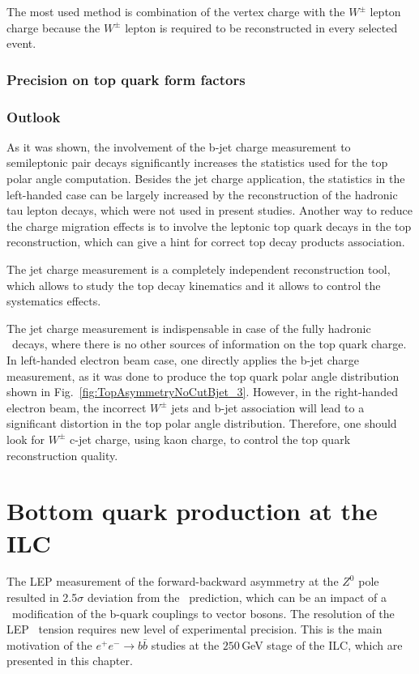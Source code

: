 The most used method is combination of the vertex charge with the $W^\pm$ lepton charge because the $W^\pm$ lepton is required to be reconstructed in every selected event. 
\subsubsection{Precision on top quark form factors }

\subsubsection{Outlook}
As it was shown, the involvement of the b-jet charge measurement to semileptonic \ttbar pair decays significantly increases the statistics used for the top polar angle computation.
Besides the jet charge application, the statistics in the left-handed case can be largely increased by the reconstruction of the hadronic tau lepton decays, which were not used in present studies. 
Another way to reduce the charge migration effects is to involve the leptonic top quark decays in the top reconstruction, which can give a hint for correct top decay products association.

The jet charge measurement is a completely independent reconstruction tool, which allows to study the top decay kinematics and it allows to control the systematics effects.

The jet charge measurement is indispensable in case of the fully hadronic \ttbar\ decays, where there is no other sources of information on the top quark charge. 
In left-handed electron beam case, one directly applies the b-jet charge measurement, as it was done to produce the top quark polar angle distribution shown in Fig.~\ref{fig:TopAsymmetryNoCutBjet_3}. 
However, in the right-handed electron beam, the incorrect $W^\pm$ jets and b-jet association will lead to a significant distortion in the top polar angle distribution. Therefore, one should look for $W^\pm$ c-jet charge, using kaon charge, to control the top quark reconstruction quality. 


\section{Bottom quark production at the ILC}
The LEP measurement of the forward-backward asymmetry at the $Z^0$ pole resulted in 2.5$\sigma$ deviation from the \sm\ prediction, which can be an impact of a \bsm\ modification of the b-quark couplings to vector bosons.
The resolution of the LEP \afbb\ tension requires new level of experimental precision.
This is the main motivation of the $e^+e^-\to b\bar{b}$ studies at the $250$\,GeV stage of the ILC, which are presented in this chapter. 

